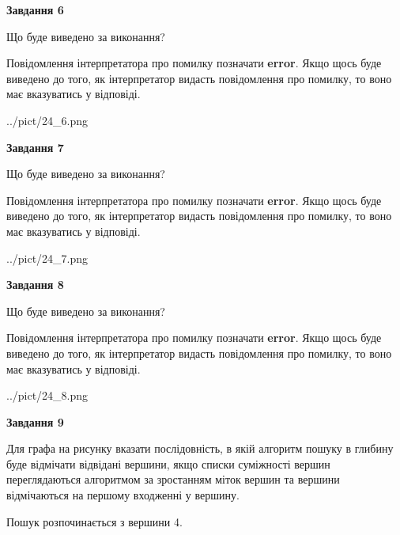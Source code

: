 \documentclass[12pt, ukrainian]{article}
\begin{document}
{\begin {large}
{\begin {center}\textbf{Завдання 6}\end {center}}\par
Що буде виведено за виконання?

Повідомлення інтерпретатора про помилку позначати \textbf{error}.
Якщо щось буде виведено до того, як інтерпретатор видасть повідомлення про помилку, 
то воно має вказуватись у відповіді. \par


\begin{center}
	{../pict/24_6.png}
\end{center}
\newpage

{\begin {center}\textbf{Завдання 7}\end {center}}\par
Що буде виведено за виконання?

Повідомлення інтерпретатора про помилку позначати \textbf{error}.
Якщо щось буде виведено до того, як інтерпретатор видасть повідомлення про помилку, 
то воно має вказуватись у відповіді. \par


\begin{center}
	{../pict/24_7.png}
\end{center}
\newpage

{\begin {center}\textbf{Завдання 8}\end {center}}\par
Що буде виведено за виконання?

Повідомлення інтерпретатора про помилку позначати \textbf{error}.
Якщо щось буде виведено до того, як інтерпретатор видасть повідомлення про помилку, 
то воно має вказуватись у відповіді. \par


\begin{center}
	{../pict/24_8.png}
\end{center}
\newpage

{\begin {center}\textbf{Завдання 9}\end {center}}\par
Для графа на рисунку вказати послідовність, в якій алгоритм пошуку в глибину буде відмічати відвідані вершини, якщо списки суміжності вершин переглядаються алгоритмом за зростанням міток вершин та вершини відмічаються на першому вход\-женні у вершину.\par
Пошук розпочинається з вершини 4.\par


\end{large}}
\end{document}
